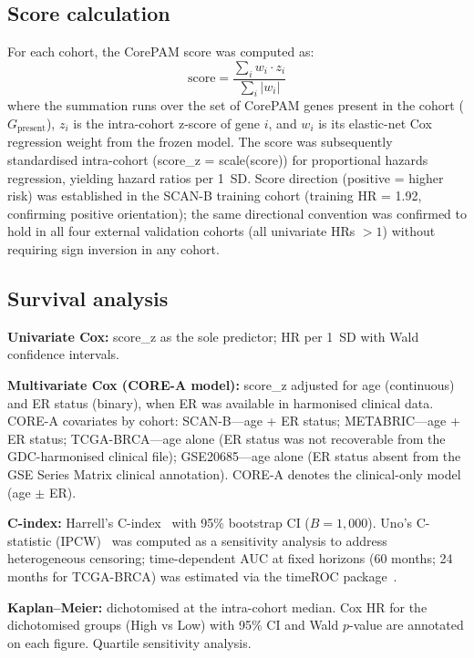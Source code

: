 \documentclass[pdflatex,sn-vancouver-num]{sn-jnl}
\begin{document}
\subsection{Score calculation}\label{subsec:score-calculation}

For each cohort, the CorePAM score was computed as:
\begin{equation}
\text{score} = \frac{\sum_{i} w_i \cdot z_i}{\sum_{i} |w_i|}
\end{equation}
where the summation runs over the set of CorePAM genes present in the cohort ($G_{\text{present}}$), $z_i$ is the intra-cohort z-score of gene $i$, and $w_i$ is its elastic-net Cox regression weight from the frozen model. The score was subsequently standardised intra-cohort (score\_z = scale(score)) for proportional hazards regression, yielding hazard ratios per 1~SD. Score direction (positive = higher risk) was established in the SCAN-B training cohort (training HR = 1.92, confirming positive orientation); the same directional convention was confirmed to hold in all four external validation cohorts (all univariate HRs $> 1$) without requiring sign inversion in any cohort.

\subsection{Survival analysis}\label{subsec:survival-analysis}

\textbf{Univariate Cox:} score\_z as the sole predictor; HR per 1~SD with Wald confidence intervals.

\textbf{Multivariate Cox (CORE-A model):} score\_z adjusted for age (continuous) and ER status (binary), when ER was available in harmonised clinical data. CORE-A covariates by cohort: SCAN-B---age + ER status; METABRIC---age + ER status; TCGA-BRCA---age alone (ER status was not recoverable from the GDC-harmonised clinical file); GSE20685---age alone (ER status absent from the GSE Series Matrix clinical annotation). CORE-A denotes the clinical-only model (age $\pm$ ER).

\textbf{C-index:} Harrell's C-index~\cite{harrell1982} with 95\% bootstrap CI ($B = 1{,}000$). Uno's C-statistic (IPCW)~\cite{uno2011} was computed as a sensitivity analysis to address heterogeneous censoring; time-dependent AUC at fixed horizons (60 months; 24 months for TCGA-BRCA) was estimated via the timeROC package~\cite{blanche2013}.

\textbf{Kaplan--Meier:} dichotomised at the intra-cohort median. Cox HR for the dichotomised groups (High vs Low) with 95\% CI and Wald $p$-value are annotated on each figure. Quartile sensitivity analysis.
\end{document}
